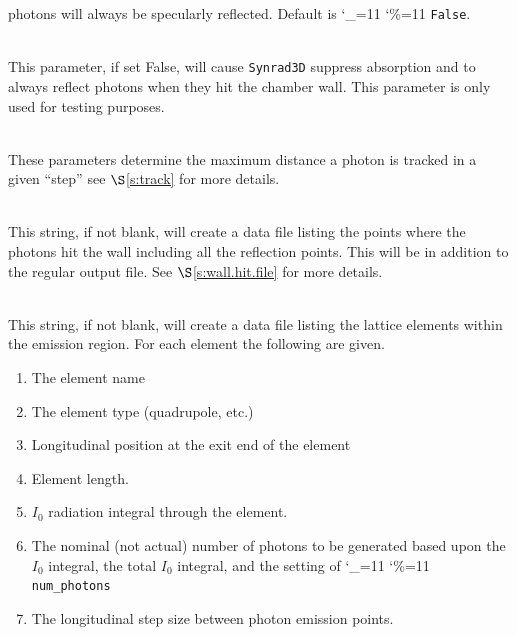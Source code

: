 \documentclass[11pt,openany]{report}
\newcommand{\sref}[1]{$\S$\ref{#1}}
\newcommand{\srthree}{\texttt{Synrad3D}\xspace}
\newcommand\ttcmd{\begingroup\catcode`\_=11 \catcode`\%=11 \dottcmd}
\newcommand\dottcmd[1]{\texttt{#1}\endgroup}
\newcommand{\vn}{\ttcmd}
\newcommand{\Newline}{\hfil \\}
\begin{document}
\begin{description}
photons will always be specularly reflected. Default is \vn{False}.
  \item[\vn{sr3d_params\%allow_absorption}] \Newline
This parameter, if set False, will cause \srthree suppress absorption
and to always reflect photons when they hit the chamber wall. This
parameter is only used for testing purposes.
  \item[\vn{sr3d_params\%ds_track_step_max}, \vn{sr3d_params\%dr_track_step_max}] \Newline
These parameters determine the maximum distance a photon is tracked in
a given ``step'' see \sref{s:track} for more details.
  \item[\vn{wall_hit_file}] \Newline
This string, if not blank, will create a data file listing the points
where the photons hit the wall including all the reflection
points. This will be in addition to the regular output file.  See
\sref{s:wall.hit.file} for more details.
  \item[\vn{lat_ele_file}] \Newline
This string, if not blank, will create a data file listing  the lattice
elements within the emission region. For each element the following are given. 
  \begin{enumerate}
  \item
    The element name
  \item
    The element type (quadrupole, etc.)
  \item
    Longitudinal position at the exit end of the element
  \item
    Element length.
  \item
    $I_0$ radiation integral through the element.
  \item
    The nominal (not actual) number of photons to be generated based upon the $I_0$ integral,
    the total $I_0$ integral, and the setting of \vn{num_photons}
  \item
    The longitudinal step size between photon emission points.
  \end{enumerate}


\end{description}
\end{document}
